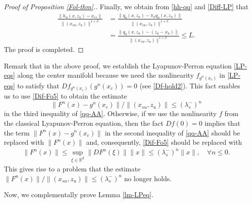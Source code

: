 \documentclass[reqno]{amsart}
\numberwithin{equation}{section}
\begin{document}
\begin{proof}[Proof of Proposition {\rm \ref{Fol-thm}.}]
Finally, we obtain from \eqref{hh-qq} and \eqref{Diff-LP}   that
\begin{align}\label{Dec-9}
\frac{\|h_u(x,z_u)-x_{cs}\|}{\|(x_{su},z_u)\|^{1+\beta}}
&=\frac{\|q_0(x,z_u)- \pi_u q_0(x,z_u)\|}{\|(x_{su},z_u)\|^{1+\beta}}
\nonumber\\
&=\frac{\|q_0(x,z_u)-(z_u-x_u)\|}{\|(x_{su},z_u)\|^{1+\beta}}
\le L.
\end{align}
The proof is completed.
\end{proof}

Remark that in the above proof, we establish the Lyapunov-Perron equation \eqref{LP-eqs} along the center manifold because we need the nonlinearity $f_{g^n(x_c)}$ in \eqref{LP-eqs} to satisfy that $Df_{g^n(x_c)}(g^n(x_c))=0$ (see \eqref{Df-hold2}). This fact enables us to use \eqref{Dif-Fo5} to obtain the estimate
$$
\|F^n(x)-g^n(x_c)\|/\|(x_{su},z_u)\|\le  (\lambda_s^-)^{n}
$$
in the third inequality of \eqref{qq-AA}.
Otherwise, if we use the nonlinearity $f$ from the classical Lyapunov-Perron equation, then the fact $Df(0)=0$ implies that the term $\|F^n(x)-g^n(x_c)\|$ in the second inequality of \eqref{qq-AA} should be replaced with $\|F^n(x)\|$ and, consequently, \eqref{Dif-Fo5} should be replaced with
\begin{align*}
\|F^n(x)\|
\le \sup_{\xi\in\mathbb{R}^d} \|DF^n(\xi)\| \|x\| \le  (\lambda_s^-)^{n} \|x\|,\quad \forall n\le 0.
\end{align*}
This gives rise to a problem that the estimate $\|F^n(x)\|/\|(x_{su},z_u)\|\le  (\lambda_s^-)^{n}$ no longer holds.

Now, we complementally prove Lemma \ref{lm-LPeq}.
\end{document}
